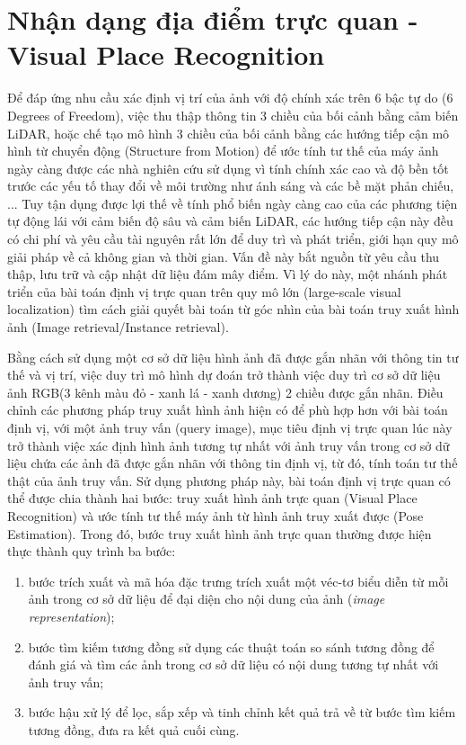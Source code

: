 \section{Nhận dạng địa điểm trực quan - Visual Place Recognition}

Để đáp ứng nhu cầu xác định vị trí của ảnh với độ chính xác trên 6 bậc tự do (6 Degrees of Freedom), việc thu thập thông tin 3 chiều của bối cảnh bằng cảm biến LiDAR, hoặc chế tạo mô hình 3 chiều của bối cảnh bằng các hướng tiếp cận mô hình từ chuyển động (Structure from Motion) để ước tính tư thế của máy ảnh ngày càng được các nhà nghiên cứu sử dụng vì tính chính xác cao và độ bền tốt trước các yếu tố thay đổi về môi trường như ánh sáng và các bề mặt phản chiếu, ... Tuy tận dụng được lợi thế về tính phổ biến ngày càng cao của các phương tiện tự động lái với cảm biến độ sâu và cảm biến LiDAR, các hướng tiếp cận này đều có chi phí và yêu cầu tài nguyên rất lớn để duy trì và phát triển, giới hạn quy mô giải pháp về  cả không gian và thời gian. Vấn đề này bắt nguồn từ yêu cầu thu thập, lưu trữ và cập nhật dữ liệu đám mây điểm. Vì lý do này, một nhánh phát triển của bài toán định vị trực quan trên quy mô lớn (large-scale visual localization) tìm cách giải quyết bài toán từ góc nhìn của bài toán truy xuất hình ảnh\cite{2022arXiv220105816X} (Image retrieval/Instance retrieval).

Bằng cách sử dụng một cơ sở dữ liệu hình ảnh đã được gắn nhãn với thông tin tư thế và vị trí, việc duy trì mô hình dự đoán trở thành việc duy trì cơ sở dữ liệu ảnh RGB(3 kênh màu đỏ - xanh lá - xanh dương) 2 chiều được gắn nhãn. Điều chỉnh các phương pháp truy xuất hình ảnh hiện có để phù hợp hơn với bài toán định vị, với một ảnh truy vấn (query image), mục tiêu định vị trực quan lúc này trở thành việc xác định hình ảnh tương tự nhất với ảnh truy vấn trong cơ sở dữ liệu chứa các ảnh đã được gắn nhãn với thông tin định vị, từ đó, tính toán tư thế thật của ảnh truy vấn. Sử dụng phương pháp này, bài toán định vị trực quan có thể được chia thành hai bước: truy xuất hình ảnh trực quan (Visual Place Recognition) và ước tính tư thế máy ảnh từ hình ảnh truy xuất được (Pose Estimation). Trong đó, bước truy xuất hình ảnh trực quan thường được hiện thực thành quy trình ba bước\cite{Masone2021ASO}:

\begin{enumerate}
    \item bước trích xuất và mã hóa đặc trưng trích xuất một véc-tơ biểu diễn từ mỗi ảnh trong cơ sở dữ liệu để đại diện cho nội dung của ảnh (\textit{image representation});
    \item bước tìm kiếm tương đồng sử dụng các thuật toán so sánh tương đồng để đánh giá và tìm các ảnh trong cơ sở dữ liệu có nội dung tương tự nhất với ảnh truy vấn;
    \item bước hậu xử lý để lọc, sắp xếp và tinh chỉnh kết quả trả về từ bước tìm kiếm tương đồng, đưa ra kết quả cuối cùng.
\end{enumerate}

